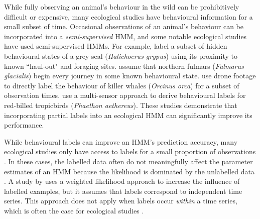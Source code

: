 While fully observing an animal's behaviour in the wild can be prohibitively difficult or expensive, many ecological studies have behavioural information for a small subset of time. Occasional observations of an animal's behaviour can be incorporated into a \textit{semi-supervised} HMM, and some notable ecological studies have used semi-supervised HMMs. For example, \citet{McClintock:2012} label a subset of hidden behavioural states of a grey seal (\textit{Halichoerus grypus}) using its proximity to known ``haul-out" and foraging sites. \citet{Pirotta:2018} assume that northern fulmars (\textit{Fulmarus glacialis}) begin every journey in some known behavioural state. \citet{McRae:2024} use drone footage to directly label the behaviour of killer whales (\textit{Orcinus orca}) for a subset of observation times. \citet{Saldanha:2023} use a multi-sensor approach to derive behavioural labels for red-billed tropicbirds (\textit{Phaethon aethereus}). These studies demonstrate that incorporating partial labels into an ecological HMM can significantly improve its performance.

While behavioural labels can improve an HMM's prediction accuracy, many ecological studies only have access to labels for a small proportion of observations \citep[e.g., $< 10$\%,][]{Saldanha:2023, McRae:2024}. In these cases, the labelled data often do not meaningfully affect the parameter estimates of an HMM because the likelihood is dominated by the unlabelled data \citep{Chapelle:2006, Ren:2020}. A study by \citet{Ji:2009} uses a weighted likelihood approach to increase the influence of labelled examples, but it assumes that labels correspond to independent time series. This approach does not apply when labels occur \textit{within} a time series, which is often the case for ecological studies \citep{Saldanha:2023, McRae:2024}. 

